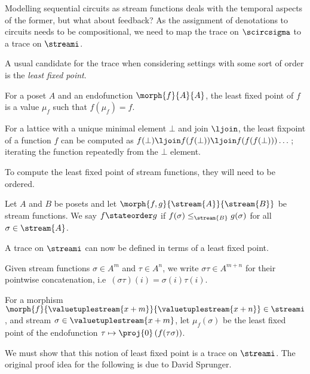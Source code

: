 Modelling sequential circuits as stream functions deals with the temporal
aspects of the former, but what about feedback?
As the assignment of denotations to circuits needs to be compositional, we need
to map the trace on \(\scircsigma\) to a trace on \(\streami\).

A usual candidate for the trace when considering settings with some sort of
order is the \emph{least fixed point}.

\begin{definition}
    For a poset \(A\) and an endofunction \(\morph{f}{A}{A}\), the least fixed
    point of \(f\) is a value \(\mu_f\) such that \(f(\mu_f) = f\).
\end{definition}

For a lattice with a unique minimal element \(\bot\) and join \(\ljoin\), the
least fixpoint of a function \(f\) can be computed as
\(f(\bot) \ljoin f(f(\bot)) \ljoin f(f(f(\bot))) \dots\); iterating the function
repeatedly from the \(\bot\) element.

To compute the least fixed point of stream functions, they will need to be
ordered.

\begin{definition}\label{def:state-order}
    Let \(A\) and \(B\) be posets and let
    \(\morph{f, g}{\stream{A}}{\stream{B}}\) be stream functions.
    We say \(f \stateorder g\) if \(f(\sigma) \leq_{\stream{B}} g(\sigma)\)
    for all \(\sigma \in \stream{A}\).
\end{definition}

A trace on \(\streami\) can now be defined in terms of a least fixed
point.

\begin{notation}
    Given stream functions \(\sigma \in A^m\) and \(\tau \in A^n\), we write
    \(\sigma\tau \in A^{m+n}\) for their pointwise concatenation, i.e\
    \((\sigma\tau)(i) = \sigma(i)\tau(i)\).
\end{notation}

\begin{notation}
    For a morphism \(
    \morph{f}{\valuetuplestream{x+m}}{\valuetuplestream{x+n}}
    \in \streami
    \), and stream \(\sigma \in \valuetuplestream{x+m}\), let
    \(\mu_f(\sigma)\) be the least fixed point of the endofunction \(
    \tau \mapsto \proj{0}\left(f(\tau\sigma)\right)
    \).
\end{notation}

We must show that this notion of least fixed point is a trace on \(\streami\).
The original proof idea for the following is due to David Sprunger.

